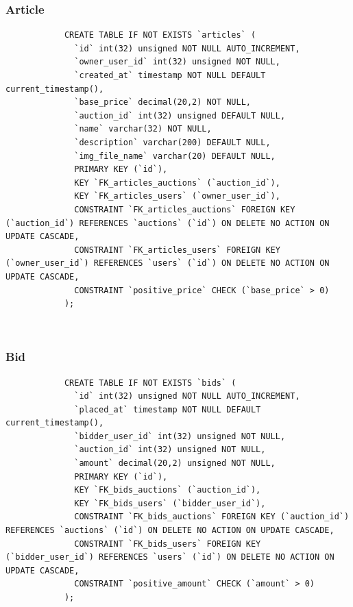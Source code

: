\documentclass[12pt, a4paper, renqo, final]{amsart}
\begin{document}
		\subsubsection{Article}
		\phantom{.}
		\begin{lstlisting}
			CREATE TABLE IF NOT EXISTS `articles` (
			  `id` int(32) unsigned NOT NULL AUTO_INCREMENT,
			  `owner_user_id` int(32) unsigned NOT NULL,
			  `created_at` timestamp NOT NULL DEFAULT current_timestamp(),
			  `base_price` decimal(20,2) NOT NULL,
			  `auction_id` int(32) unsigned DEFAULT NULL,
			  `name` varchar(32) NOT NULL,
			  `description` varchar(200) DEFAULT NULL,
			  `img_file_name` varchar(20) DEFAULT NULL,
			  PRIMARY KEY (`id`),
			  KEY `FK_articles_auctions` (`auction_id`),
			  KEY `FK_articles_users` (`owner_user_id`),
			  CONSTRAINT `FK_articles_auctions` FOREIGN KEY (`auction_id`) REFERENCES `auctions` (`id`) ON DELETE NO ACTION ON UPDATE CASCADE,
			  CONSTRAINT `FK_articles_users` FOREIGN KEY (`owner_user_id`) REFERENCES `users` (`id`) ON DELETE NO ACTION ON UPDATE CASCADE,
			  CONSTRAINT `positive_price` CHECK (`base_price` > 0)
			);
		\end{lstlisting}
		\phantom{.}\\

		\subsubsection{Bid}
		\phantom{.}
		\begin{lstlisting}
			CREATE TABLE IF NOT EXISTS `bids` (
			  `id` int(32) unsigned NOT NULL AUTO_INCREMENT,
			  `placed_at` timestamp NOT NULL DEFAULT current_timestamp(),
			  `bidder_user_id` int(32) unsigned NOT NULL,
			  `auction_id` int(32) unsigned NOT NULL,
			  `amount` decimal(20,2) unsigned NOT NULL,
			  PRIMARY KEY (`id`),
			  KEY `FK_bids_auctions` (`auction_id`),
			  KEY `FK_bids_users` (`bidder_user_id`),
			  CONSTRAINT `FK_bids_auctions` FOREIGN KEY (`auction_id`) REFERENCES `auctions` (`id`) ON DELETE NO ACTION ON UPDATE CASCADE,
			  CONSTRAINT `FK_bids_users` FOREIGN KEY (`bidder_user_id`) REFERENCES `users` (`id`) ON DELETE NO ACTION ON UPDATE CASCADE,
			  CONSTRAINT `positive_amount` CHECK (`amount` > 0)
			);
		\end{lstlisting}
		\phantom{.}\\
		
\end{document}
